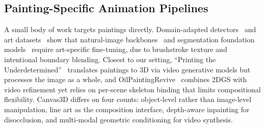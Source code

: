 \subsection{Painting-Specific Animation Pipelines}

A small body of work targets paintings directly. Domain-adapted
detectors~\cite{chen2025pldsyolo} and art
datasets~\cite{saleh2016metric} show that natural-image
backbones~\cite{jocher2023yolov8,wang2024yolov9,wang2024yolov10,tian2025yolov12}
and segmentation foundation
models~\cite{kirillov2023sam,ravi2024sam2} require art-specific
fine-tuning, due to brushstroke texture and intentional boundary
blending. Closest to our setting, ``Printing the
Underdetermined''~\cite{ming2026printing} translates paintings to 3D
via video generative models but processes the image as a whole, and
OilPaintingRevive~\cite{oilpaintingrevive2026} combines 2DGS with
video refinement yet relies on per-scene skeleton binding that limits
compositional flexibility. Canvas3D differs on four counts:
object-level rather than image-level manipulation, line art as the
composition interface, depth-aware inpainting for disocclusion, and
multi-modal geometric conditioning for video synthesis.

